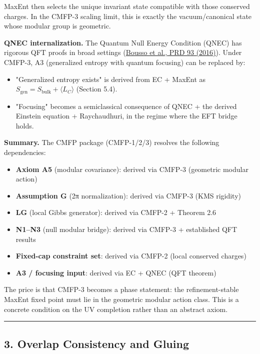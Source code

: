MaxEnt then selects the unique invariant state compatible with those conserved charges. In the CMFP-3 scaling limit, this is exactly the vacuum/canonical state whose modular group is geometric.

\textbf{QNEC internalization.} The Quantum Null Energy Condition (QNEC) has rigorous QFT proofs in broad settings (\href{https://arxiv.org/abs/1509.02542}{Bousso et al., PRD 93 (2016)}). Under CMFP-3, A3 (generalized entropy with quantum focusing) can be replaced by:

\begin{itemize}
\item
  "Generalized entropy exists" is derived from EC + MaxEnt as \(S_{\mathrm{gen}} = S_{\mathrm{bulk}} + \langle L_C \rangle\) (Section 5.4).
\item
  "Focusing" becomes a semiclassical consequence of QNEC + the derived Einstein equation + Raychaudhuri, in the regime where the EFT bridge holds.
\end{itemize}

\textbf{Summary.} The CMFP package (CMFP-1/2/3) resolves the following dependencies:

\begin{itemize}
\tightlist
\item
  \textbf{Axiom A5} (modular covariance): derived via CMFP-3 (geometric modular action)
\item
  \textbf{Assumption G} (2π normalization): derived via CMFP-3 (KMS rigidity)
\item
  \textbf{LG} (local Gibbs generator): derived via CMFP-2 + Theorem 2.6
\item
  \textbf{N1--N3} (null modular bridge): derived via CMFP-3 + established QFT results
\item
  \textbf{Fixed-cap constraint set}: derived via CMFP-2 (local conserved charges)
\item
  \textbf{A3 / focusing input}: derived via EC + QNEC (QFT theorem)
\end{itemize}

The price is that CMFP-3 becomes a phase statement: the refinement-stable MaxEnt fixed point must lie in the geometric modular action class. This is a concrete condition on the UV completion rather than an abstract axiom.

\begin{center}\rule{0.5\linewidth}{0.5pt}\end{center}

\subsection{3. Overlap Consistency and Gluing}\label{3-overlap-consistency-and-gluing}

